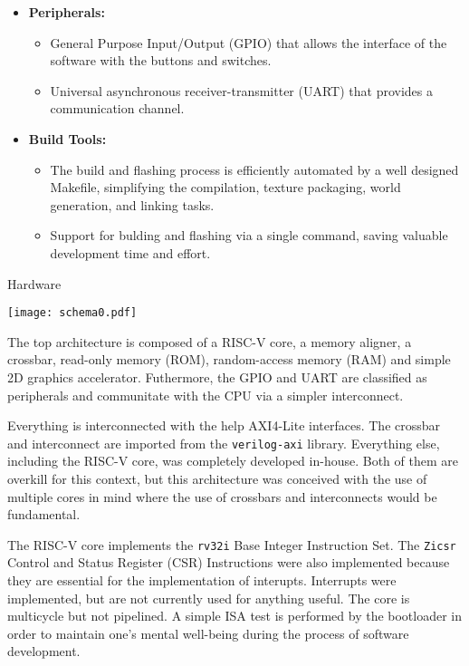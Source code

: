 \documentclass[12pt,a4paper]{article}
\makeatletter
\renewcommand{\section}{%
  \@startsection{section}{1}{0pt}{-3.5ex plus -1ex minus -.2ex}{2.3ex plus .2ex}{\Large\bfseries\sffamily}%
}
\makeatother
\begin{document}
\begin{multicols}{2}
\begin{itemize}
\item \textbf{Peripherals:}
\begin{itemize}
\item General Purpose Input/Output (GPIO) that allows the interface of the
software with the buttons and switches. 
\item Universal asynchronous receiver-transmitter (UART) that provides a
communication channel.
\end{itemize}

\item \textbf{Build Tools:}
\begin{itemize}
\item The build and flashing process is efficiently automated by a well designed
Makefile, simplifying the compilation, texture packaging, world generation, and
linking tasks.
\item Support for bulding and flashing via a single command, saving valuable
development time and effort.
\end{itemize}

\end{itemize}
\end{multicols}

\pagebreak

\section{Hardware}

\begin{center}
\texttt{[image: schema0.pdf]}
\label{fig:schema0}
\end{center}

The top architecture is composed of a RISC-V core, a memory aligner, a crossbar,
read-only memory (ROM), random-access memory (RAM) and simple 2D graphics
accelerator. Futhermore, the GPIO and UART are classified as peripherals and
communitate with the CPU via a simpler interconnect.

Everything is interconnected with the help AXI4-Lite interfaces. The crossbar
and interconnect are imported from the \texttt{verilog-axi} library.
Everything else, including the RISC-V core, was completely developed in-house.
Both of them are overkill for this context, but this architecture was conceived
with the use of multiple cores in mind where the use of crossbars and
interconnects would be fundamental.

The RISC-V core implements the \texttt{rv32i} Base Integer Instruction Set. The 
\texttt{Zicsr} Control and Status Register (CSR) Instructions were also
implemented because they are essential for the implementation of interupts. 
Interrupts were implemented, but are not currently used for anything useful.
The core is multicycle but not pipelined. A simple ISA test is performed by the
bootloader in order to maintain one's mental well-being during the process of
software development.
\end{document}
